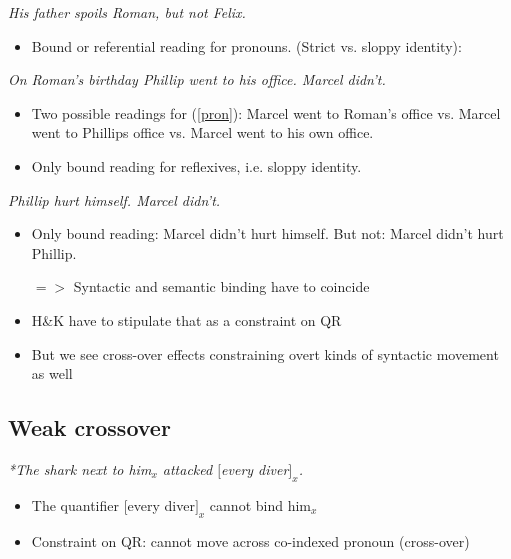 \documentclass[a4paper]{article}
\begin{document}
\begin{exe}
	\ex \emph{His father spoils Roman, but not Felix.}
\end{exe}

\begin{itemize}
	\item Bound or referential reading for pronouns. (Strict vs. sloppy identity):
\end{itemize}

\begin{exe}
	\ex \label{pron} \emph{On Roman's birthday Phillip went to his office. Marcel didn't.}
\end{exe}

\begin{itemize}
	\item Two possible readings for (\ref{pron}): Marcel went to Roman's office vs. Marcel went to Phillips office vs. Marcel went to his own office.
	\item Only bound reading for reflexives, i.e. sloppy identity.
\end{itemize}

\begin{exe}
	\ex \emph{Phillip hurt himself. Marcel didn't.}
\end{exe}
\begin{itemize}
	\item Only bound reading: Marcel didn't hurt himself. But not: Marcel didn't hurt Phillip.
	\item[$=>$] Syntactic and semantic binding have to coincide
	\item H\&K have to stipulate that as a constraint on QR
	\item But we see cross-over effects constraining overt kinds of syntactic movement as well
\end{itemize}




\subsection{Weak crossover}

\begin{exe}
	\ex \label{weakcr} \emph{*The shark next to him$_x$ attacked $[$every diver$]_x$.}
\end{exe}

\begin{itemize}
	\item The quantifier $[$every diver$]_x$ cannot bind him$_x$
	\item Constraint on QR: cannot move across co-indexed pronoun (cross-over)
\end{itemize}
\end{document}
